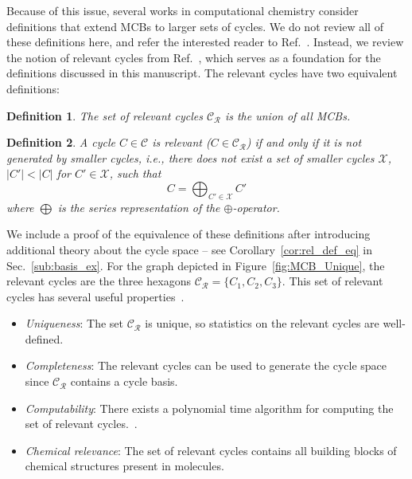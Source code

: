 \documentclass[fleqn,11pt]{article}
\newtheorem{definition}{Definition}
\newcommand\calX{\mathcal{X}}     %
\newcommand\CycSp{\mathcal{C}}    %
\newcommand\RelCyc{\mathcal{C_R}} %
\begin{document}
Because of this issue, several works in computational chemistry consider definitions that extend MCBs to larger sets of cycles. We do not review all of these definitions here, and refer the interested reader to Ref.~\cite{bergerCounterexamples2004}. Instead, we review the notion of relevant cycles from Ref.~\cite{vismaraUnion1997}, which serves as a foundation for the definitions discussed in this manuscript. The relevant cycles have two equivalent definitions:
\begin{definition}
	The set of relevant cycles $\RelCyc$ is the union of all MCBs.\label{def:rel}
\end{definition}
\begin{definition}
	A cycle $C\in\CycSp$ is relevant ($C\in\RelCyc$) if and only if it is not generated by smaller cycles, i.e., there does not exist a set of smaller cycles $\calX$, $|C'|<|C|$ for $C'\in\calX$, such that
	\begin{equation}
		C = \bigoplus_{C'\in\calX} C'
	\end{equation}
	where $\bigoplus$ is the series representation of the $\oplus$-operator.
	\label{def:rel_2}
\end{definition}
We include a proof of the equivalence of these definitions after introducing additional theory about the cycle space -- see Corollary~\ref{cor:rel_def_eq} in Sec.~\ref{sub:basis_ex}. For the graph depicted in Figure~\ref{fig:MCB_Unique}, the relevant cycles are the three hexagons $\RelCyc=\{C_1,C_2,C_3\}$. This set of relevant cycles has several useful properties~\cite{bergerCounterexamples2004}. %
\begin{itemize}
	\item \textit{Uniqueness}: The set $\RelCyc$ is unique, so statistics on the relevant cycles are well-defined.
	\item \textit{Completeness}: The relevant cycles can be used to generate the cycle space since $\RelCyc$ contains a cycle basis.
	\item \textit{Computability}: There exists a polynomial time algorithm for computing the set of relevant cycles.~\cite{vismaraUnion1997}.
	\item \textit{Chemical relevance}: 
	The set of relevant cycles contains all building blocks of chemical structures present in molecules. 
\end{itemize}
\end{document}
